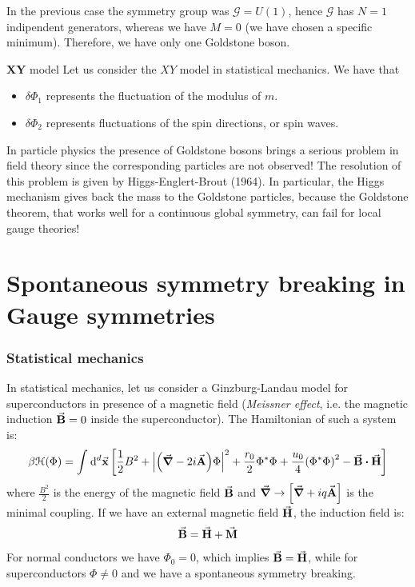 \documentclass[../main/main.tex]{subfiles}
\begin{document}
In the previous case the symmetry group was \( \mathcal{G} = U (1) \), hence \( \mathcal{G} \) has \( N=1 \) indipendent generators, whereas we have \( M=0 \) (we have chosen a specific minimum). Therefore, we have only one Goldstone boson.


\begin{example}{\(\pmb{XY}\) model}{}
Let us consider the \( XY \) model in statistical mechanics. We have that
\begin{itemize}
\item \( \delta \Phi _1 \) represents the fluctuation of the modulus of \( m \).
\item \( \delta \Phi _2 \) represents fluctuations of the spin directions, or spin waves.
\end{itemize}
\end{example}

\begin{remark}
In particle physics the presence of Goldstone bosons brings a serious problem in field theory since the corresponding particles are not observed! The resolution of this problem is given by Higgs-Englert-Brout (1964). In particular, the Higgs mechanism gives back the mass to the Goldstone particles, because the Goldstone theorem, that works well for a continuous global symmetry, can fail for local gauge theories!
\end{remark}



\section{Spontaneous symmetry breaking in Gauge symmetries}

\subsubsection{Statistical mechanics}

In statistical mechanics, let us consider a Ginzburg-Landau model for superconductors in presence of a magnetic field (\emph{Meissner effect}, i.e. the magnetic induction \( \va{B} = 0 \) inside the superconductor). The Hamiltonian of such a system is:
\begin{equation}
  \beta \mathcal{H} (\Phi ) = \int_{}^{} \dd[d]{\va{x}} \qty[\frac{1}{2}B^2 + \abs{\qty(\va{\grad }- 2 i \va{A})\Phi  }^2 + \frac{r_0}{2} \Phi ^* \Phi
  + \frac{u_0}{4} \qty(\Phi ^* \Phi )^2 - \va{B} \vdot \va{H}]
\end{equation}
where \( \frac{B^2}{2} \) is the energy of the magnetic field \( \va{B} \) and \( \va{\grad } \rightarrow \qty[\va{\grad } + i q \va{A}]  \) is the minimal coupling.
If we have an external magnetic field \( \va{H} \), the induction field is:
\begin{equation*}
  \va{B} = \va{H} + \va{M}
\end{equation*}
For normal conductors we have \( \Phi _0 = 0 \), which implies \( \va{B} = \va{H} \), while for superconductors \( \Phi \neq 0 \) and we have a spontaneous symmetry breaking.
\end{document}
